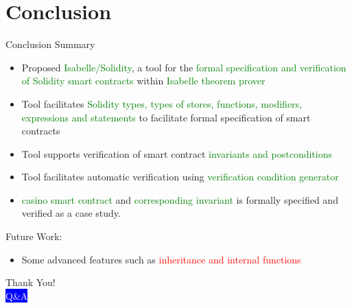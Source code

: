 \documentclass[aspectratio=169]{beamer}
\begin{document}
\section{Conclusion}
\frame{\tableofcontents[currentsection]}

\begin{frame}{Conclusion}
Summary
\begin{itemize}
	\item Proposed \textcolor{green}{Isabelle/Solidity}, a tool for the \textcolor{green}{formal specification and verification
	of Solidity smart contracts} within \textcolor{green}{Isabelle theorem prover}
	\item Tool facilitates \textcolor{green}{Solidity types, types of stores, functions, modifiers, expressions and statements} to facilitate formal specification of smart contracts
	\item Tool supports verification of smart contract \textcolor{green}{invariants and postconditions}
		\item Tool facilitates automatic  verification using \textcolor{green}{verification condition generator}
	\item  \textcolor{green}{casino smart contract} and \textcolor{green}{corresponding invariant} is formally specified and verified as a case study.

\end{itemize}
\bigskip

Future Work: 
\begin{itemize}
	\item Some advanced features such as \textcolor{red}{inheritance and internal functions}
\end{itemize}
\end{frame}
\begin{frame}{}
	\begin{center}
{\fontsize{40}{50}\selectfont Thank You!}\\
\vspace{0.5in}
{\fontsize{30}{40}\selectfont \textcolor{white}{\colorbox{blue}{Q\&A}}}\\
\end{center}
\end{frame}
%
\end{document}
